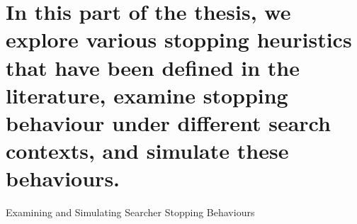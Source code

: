 
\part[Stopping Behaviours in Context]{In this part of the thesis, we explore various stopping heuristics that have been defined in the literature, examine stopping behaviour under different search contexts, and simulate these behaviours.}{Examining and Simulating Searcher Stopping Behaviours}\label{part:context}